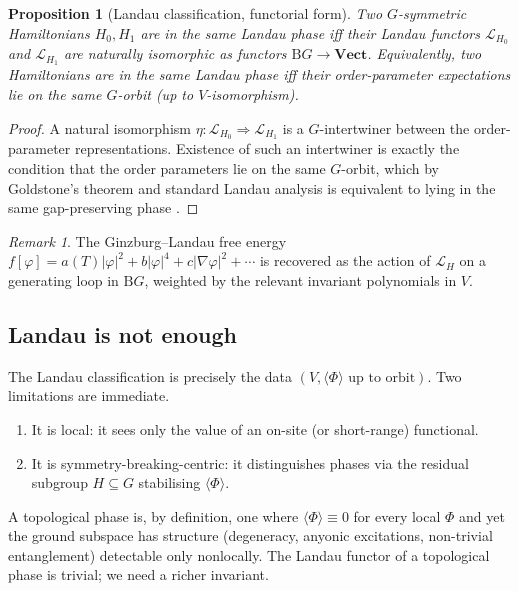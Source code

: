 \documentclass[12pt]{article}
\theoremstyle{plain}
\newtheorem{proposition}[theorem]{Proposition}
\theoremstyle{definition}
\theoremstyle{remark}
\newtheorem{remark}[theorem]{Remark}
\newcommand{\Vect}{\mathbf{Vect}}
\newcommand{\BG}{\mathrm{B}G}
\begin{document}
\begin{proposition}[Landau classification, functorial form]
\label{prop:landau}
Two $G$-symmetric Hamiltonians $H_{0},H_{1}$ are in the same Landau phase iff their
Landau functors $\mathcal{L}_{H_{0}}$ and $\mathcal{L}_{H_{1}}$ are naturally isomorphic
as functors $\BG\to\Vect$. Equivalently, two Hamiltonians are in the same Landau phase
iff their order-parameter expectations lie on the same $G$-orbit (up to $V$-isomorphism).
\end{proposition}

\begin{proof}
A natural isomorphism $\eta:\mathcal{L}_{H_{0}}\Rightarrow\mathcal{L}_{H_{1}}$ is a
$G$-intertwiner between the order-parameter representations. Existence of such an
intertwiner is exactly the condition that the order parameters lie on the same $G$-orbit,
which by Goldstone's theorem and standard Landau analysis is equivalent to lying in the
same gap-preserving phase \cite{LandauLifshitz1980,Wilson1983}.
\end{proof}

\begin{remark}
The Ginzburg--Landau free energy
$
f[\varphi]=a(T)|\varphi|^{2}+b|\varphi|^{4}+c|\nabla\varphi|^{2}+\cdots
$
is recovered as the action of $\mathcal{L}_{H}$ on a generating loop in $\BG$, weighted
by the relevant invariant polynomials in $V$.
\end{remark}

\subsection{Landau is not enough}

The Landau classification is precisely the data
$(V,\langle\Phi\rangle\text{ up to orbit})$. Two limitations are immediate.
\begin{enumerate}[label=(\roman*)]
  \item It is local: it sees only the value of an on-site (or short-range) functional.
  \item It is symmetry-breaking-centric: it distinguishes phases via the residual
    subgroup $H\subseteq G$ stabilising $\langle\Phi\rangle$.
\end{enumerate}
A topological phase is, by definition, one where $\langle\Phi\rangle\equiv 0$ for every
local $\Phi$ and yet the ground subspace has structure (degeneracy, anyonic excitations,
non-trivial entanglement) detectable only nonlocally. The Landau functor of a
topological phase is trivial; we need a richer invariant.
\end{document}
